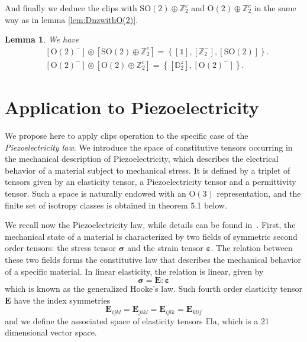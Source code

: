 \documentclass[11pt,a4paper]{amsart}
\newtheorem{lem}[thm]{Lemma}
\theoremstyle{definition}
\newcommand{\ZZ}{\mathbb{Z}}                %
\newcommand{\Ela}{\mathbb{E}\mathrm{la}}    %
\newcommand{\OO}{\mathrm{O}}                %
\newcommand{\SO}{\mathrm{SO}}               %
\newcommand{\DD}{\mathbb{D}}                %
\newcommand{\1}{\mathds{1}}		            %
\newcommand{\bE}{\mathbf{E}}                %
\newcommand{\bsigma}{\boldsymbol{\sigma}}       %
\newcommand{\beps}{\boldsymbol{\varepsilon}}
\newcommand{\set}[1]{\left\{#1\right\}}     %
\begin{document}
And finally we deduce the clips with $\SO(2)\oplus \ZZ_2^c$ and $\OO(2)\oplus \ZZ_2^c$ in the same way as in lemma \ref{lem:DnzwithO(2)}.

\begin{lem}
  We have
  \begin{align*}
     & [\OO(2)^-]\circledcirc [\SO(2)\oplus \ZZ_2^c]=\set{[\1],[\ZZ_2^-],[\SO(2)]}.   \\
     & [\OO(2)^-]\circledcirc [\OO(2)\oplus \ZZ_2^c]=\set{[\DD_2^z],[\OO(2)^-]}.
  \end{align*}
\end{lem}

\section{Application to Piezoelectricity}
\label{sec:piezoelectricity}



We propose here to apply clips operation to the specific case of the \emph{Piezoelectricity law}. We introduce the space of constitutive tensors occurring in the mechanical description of Piezoelectricity, which describes the electrical behavior of a material subject to mechanical stress. It is defined by a triplet of tensors given by an elasticity tensor, a Piezoelectricity tensor and a permittivity tensor. Such a space is naturally endowed with an $\OO(3)$ representation, and the finite set of isotropy classes is obtained in theorem 5.1 below.

We recall now the Piezoelectricity law, while details can be found in~\cite{Schouten1951,Landau2013,Roy99,Ieee88}. First, the mechanical state of a material is characterized by two fields of symmetric second order tensors: the stress tensor $\bsigma$ and the strain tensor $\beps$. The relation between these two fields forms the constitutive law that describes the mechanical behavior of a specific material. In linear elasticity, the relation is linear, given by
\begin{equation*}
  \bsigma=\bE:\beps
\end{equation*}
which is known as the generalized Hooke's law. Such fourth order elasticity tensor $\bE$ have the index symmetries
\begin{equation*}
  \bE_{ijkl}=\bE_{jikl}=\bE_{ijlk}=\bE_{klij}
\end{equation*}
and we define the associated space of elasticity tensors $\Ela$, which is a 21 dimensional vector space.
\end{document}
